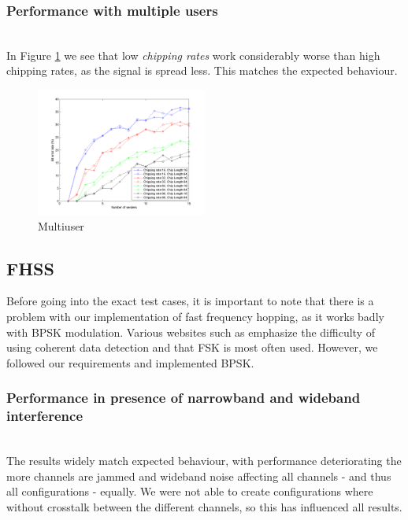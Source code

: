 		\subsubsection{Performance with multiple users}~\\
				
			In Figure \ref{fig:dsss_multiuser} we see that low \emph{chipping rates} work considerably worse than high chipping rates, as the signal is spread less.
			This matches the expected behaviour.
				
			\begin{figure}[H]
				\includegraphics[width=0.5\textwidth]{imgs/results/plot_mode_dsss-test_numSenders-rep_20-dataRate_8-dataLength_128.png}
				\caption{Multiuser}
				\label{fig:dsss_multiuser}
			\end{figure}
	
	\subsection{FHSS}
		
		Before going into the exact test cases, it is important to note that there is a problem with our implementation of fast frequency hopping, as it works badly with BPSK modulation. Various websites such as \cite{web-nl} emphasize the difficulty of using coherent data detection and that FSK is most often used. However, we followed our requirements and implemented BPSK.
		
		\subsubsection{Performance in presence of narrowband and wideband interference}~\\
			The results widely match expected behaviour, with performance deteriorating the more channels are jammed and wideband noise affecting all channels - and thus all configurations - equally.
			We were not able to create configurations where without crosstalk between the different channels, so this has influenced all results.
			
